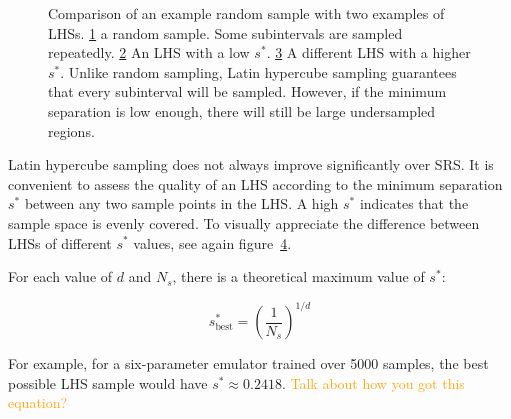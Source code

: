 \begin{figure}[ht!]
    \begin{subfigure}{0.32 \textwidth}
    \centering
 		
 		\caption{}
 		\label{fig: random_sample}
    \end{subfigure}
    \begin{subfigure}{0.32 \textwidth}
    \centering
 		
 		\caption{}
 		\label{fig: poor_lhs}
    \end{subfigure}
    \begin{subfigure}{0.32 \textwidth}
    \centering
 		
 		\caption{}
 		\label{fig: better_lhs}
    \end{subfigure}
    \centering
    \caption[Comparison of SRS and Latin hypercube sampling.]{Comparison of an 
    example
    	random sample with two examples of LHSs.
    	\ref{fig: random_sample} a random sample.
    	Some subintervals are sampled repeatedly.
	\ref{fig: poor_lhs} An LHS with a low $s^*$.    	
    	\ref{fig: better_lhs} A different LHS with a higher $s^*$.
    	Unlike random sampling,
    	Latin hypercube sampling guarantees that every subinterval will be 
    	sampled. However, if
    	the minimum separation is low enough, there will still be large
    	undersampled regions.}
    \label{fig: sample_comparison}
\end{figure}

Latin hypercube sampling does not always improve significantly over SRS. It is 
convenient to
assess the quality of an LHS according to the minimum separation $s^*$ 
between any two sample points in the LHS. A high $s^*$ indicates that 
the sample space is evenly covered. To visually appreciate the difference 
between LHSs of different $s^*$ values, see again
figure~\ref{fig: sample_comparison}.

For each value of $d$ and $N_s$, there is a theoretical maximum value of
$s^*$:

\begin{equation}
\label{eq: best_lhs_sep}
s^*_\text{best} = \left( \frac{1}{N_s} \right)^{1 / d}
\end{equation}

For example, for a six-parameter emulator trained over 5000 samples, the best
possible LHS sample would have $s^* \approx 0.2418$.
\textcolor{orange}{Talk about how you got this equation?}

